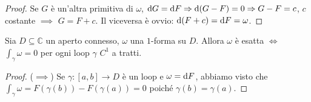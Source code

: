 \begin{proof}
  Se $G$ è un'altra primitiva di $\omega$, $\mathop{}\!\mathrm{d} G=\mathop{}\!\mathrm{d} F \Rightarrow \mathop{}\!\mathrm{d}(G-F)=0 \Rightarrow G-F=c$, $c$ costante $\implies$ $G=F+c$. Il viceversa è ovvio: $\mathop{}\!\mathrm{d}(F+c)=\mathop{}\!\mathrm{d} F=\omega$.
\end{proof}

\begin{thm} \label{int=0no1}
  Sia $D \subseteq \mathbb{C}$ un aperto connesso, $\omega$ una $1$-forma su $D$. Allora $\omega$ è esatta $\iff$ $\displaystyle \int_{\gamma} \omega=0$ per ogni loop $\gamma$ $C^1$ a tratti.
\end{thm}

\begin{proof}
  ($\implies$) Se $\gamma:[a, b] \longrightarrow D$ è un loop e $\omega=\mathop{}\!\mathrm{d} F$, abbiamo visto che $\displaystyle \int_{\gamma} \omega=F(\gamma(b))-F(\gamma(a))=0$ poiché $\gamma(b)=\gamma(a)$.


\end{proof}
